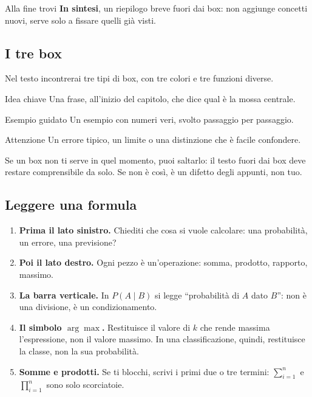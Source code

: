 \documentclass[12pt]{extarticle}
\begin{document}
\noindent
Alla fine trovi \textbf{In sintesi}, un riepilogo breve fuori dai box: non aggiunge concetti nuovi, serve solo a fissare quelli già visti.

\subsection*{I tre box}

Nel testo incontrerai tre tipi di box, con tre colori e tre funzioni diverse.

\begin{ideabox}{Idea chiave}
Una frase, all'inizio del capitolo, che dice qual è la mossa centrale.
\end{ideabox}

\begin{esempiobox}{Esempio guidato}
Un esempio con numeri veri, svolto passaggio per passaggio.
\end{esempiobox}

\begin{attenzionebox}{Attenzione}
Un errore tipico, un limite o una distinzione che è facile confondere.
\end{attenzionebox}

\noindent
Se un box non ti serve in quel momento, puoi saltarlo: il testo fuori dai box deve restare comprensibile da solo. Se non è così, è un difetto degli appunti, non tuo.

\subsection*{Leggere una formula}

\begin{enumerate}[1.]
    \item \textbf{Prima il lato sinistro.} Chiediti che cosa si vuole calcolare: una probabilità, un errore, una previsione?
    \item \textbf{Poi il lato destro.} Ogni pezzo è un'operazione: somma, prodotto, rapporto, massimo.
    \item \textbf{La barra verticale.} In $P(A\mid B)$ si legge ``probabilità di $A$ dato $B$'': non è una divisione, è un condizionamento.
    \item \textbf{Il simbolo $\arg\max$.} Restituisce il valore di $k$ che rende massima l'espressione, non il valore massimo. In una classificazione, quindi, restituisce la classe, non la sua probabilità.
    \item \textbf{Somme e prodotti.} Se ti blocchi, scrivi i primi due o tre termini: $\sum_{i=1}^{n}$ e $\prod_{i=1}^{n}$ sono solo scorciatoie.
\end{enumerate}
\end{document}

